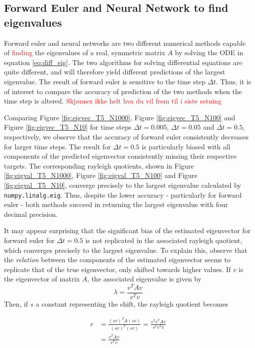 \documentclass[12pt]{extarticle}
\def\code#1{\texttt{#1}}
\begin{document}
\subsection*{Forward Euler and Neural Network to find eigenvalues}
Forward euler and neural networks are two different numerical methods capable of \textcolor{red}{finding} the eigenvalues of a real, symmetric matrix $A$ by solving the ODE in equation \eqref{eq:diff_eig}. The two algorithms for solving differential equations are quite different, and will therefore yield different predictions of the largest eigenvalue. The result of forward euler is sensitive to the time step $\Delta t$. Thus, it is of interest to compare the accuracy of prediction of the two methods when the time step is altered. \textcolor{red}{Skjønner ikke helt hva du vil frem til i siste setning}

Comparing Figure \ref{fig:eigvec_T5_N1000}, Figure \ref{fig:eigvec_T5_N100} and Figure \ref{fig:eigvec_T5_N10} for time steps $\Delta t = 0.005$, $\Delta t = 0.05$ and $\Delta t = 0.5$, respectively, we observe that the accuracy of forward euler consistently decreases for larger time steps. The result for $\Delta t=0.5$ is particularly biased with all components of the predicted eigenvector consistently missing their respective targets. The corresponding rayleigh quotients, shown in Figure \ref{fig:eigval_T5_N1000}, Figure \ref{fig:eigval_T5_N100} and Figure \ref{fig:eigval_T5_N10}, converge precisely to the largest eigenvalue calculated by \code{numpy.linalg.eig}. Thus, despite the lower accuracy - particularly for forward euler - both methods succeed in returning the largest eigenvalue with four decimal precision.

It may appear surprising that the significant bias of the estimated eigenvector for forward euler for $\Delta t =0.5$ is not replicated in the associated rayleigh quotient, which converges precisely to the largest eigenvalue. To explain this, observe that the \textit{relation} between the components of the estimated eigenvector seems to replicate that of the true eigenvector, only shifted towards higher values. If $v$ is the eigenvector of matrix $A$, the associated eigenvalue is given by
\[ \lambda = \frac{v^T A v}{v^T v} \]
Then, if $s$ a constant representing the shift, the rayleigh quotient becomes

\begin{align*}
	r &= \frac{(sv)^T A (sv)}{(sv)^T (sv)} = \frac{s^2 v^T A v}{s^2 v^T v} \\
	&= \frac{v^T A v}{v^T v}
\end{align*}
\end{document}

